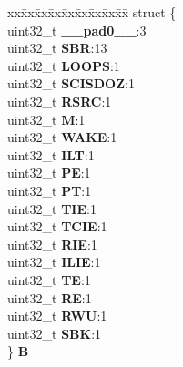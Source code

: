 \begin{DoxyCompactItemize}
\begin{tabbing}
\end{tabbing}\item 
\mbox{\label{unionESCI__tag_1_1ESCI__CR1__tag_abb5d869fff9e6ba5a5043c9db81b0d8b}} 
\begin{tabbing}
xx\=xx\=xx\=xx\=xx\=xx\=xx\=xx\=xx\=\kill
struct \{\\
\>uint32\_t {\bfseries \_\_pad0\_\_}:3\\
\>uint32\_t {\bfseries SBR}:13\\
\>uint32\_t {\bfseries LOOPS}:1\\
\>uint32\_t {\bfseries SCISDOZ}:1\\
\>uint32\_t {\bfseries RSRC}:1\\
\>uint32\_t {\bfseries M}:1\\
\>uint32\_t {\bfseries WAKE}:1\\
\>uint32\_t {\bfseries ILT}:1\\
\>uint32\_t {\bfseries PE}:1\\
\>uint32\_t {\bfseries PT}:1\\
\>uint32\_t {\bfseries TIE}:1\\
\>uint32\_t {\bfseries TCIE}:1\\
\>uint32\_t {\bfseries RIE}:1\\
\>uint32\_t {\bfseries ILIE}:1\\
\>uint32\_t {\bfseries TE}:1\\
\>uint32\_t {\bfseries RE}:1\\
\>uint32\_t {\bfseries RWU}:1\\
\>uint32\_t {\bfseries SBK}:1\\
\} {\bfseries B}\\


\end{tabbing}
\end{DoxyCompactItemize}
